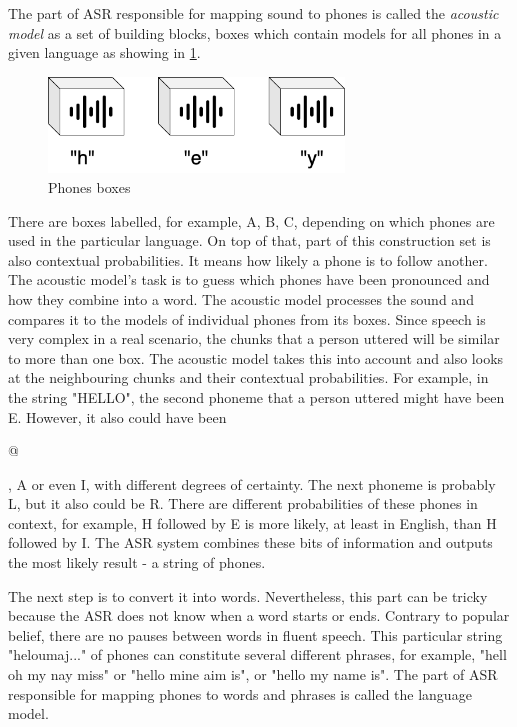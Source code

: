 The part of ASR responsible for mapping sound to phones is called the \textit{acoustic model} as a set of building blocks, boxes which contain models for all phones in a given language as showing in \cref{fig:phones_boxes}.

\begin{figure}[H]
    \centering
    \includegraphics[width=0.7\textwidth]{img/phones_boxes.png}
    \caption{Phones boxes}
    \label{fig:phones_boxes}
\end{figure}

There are boxes labelled, for example, A, B, C, depending on which phones are used in the particular language. On top of that, part of this construction set is also contextual probabilities. It means how likely a phone is to follow another. The acoustic model's task is to guess which phones have been pronounced and how they combine into a word. The acoustic model processes the sound and compares it to the models of individual phones from its boxes. Since speech is very complex in a real scenario, the chunks that a person uttered will be similar to more than one box. The acoustic model takes this into account and also looks at the neighbouring chunks and their contextual probabilities. For example, in the string "HELLO", the second phoneme that a person uttered might have been E. However, it also could have been \begin{IPA}@\end{IPA}, A or even I, with different degrees of certainty. The next phoneme is probably L, but it also could be R. There are different probabilities of these phones in context, for example, H followed by E is more likely, at least in English, than H followed by I. The ASR system combines these bits of information and outputs the most likely result - a string of phones.\citep{stanislav_petr_2020}

The next step is to convert it into words. Nevertheless, this part can be tricky because the ASR does not know when a word starts or ends. Contrary to popular belief, there are no pauses between words in fluent speech. This particular string "heloumaj..." of phones can constitute several different phrases, for example, "hell oh my nay miss" or "hello mine aim is", or "hello my name is". The part of ASR responsible for mapping phones to words and phrases is called the language model.

